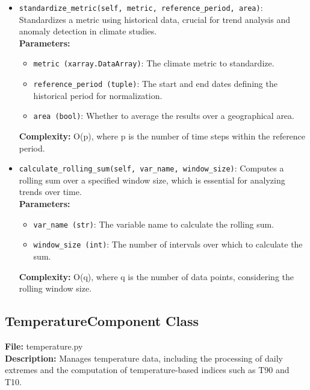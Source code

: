 \documentclass[a4paper,12pt]{article}
\begin{document}
\begin{itemize}
    \item \texttt{standardize\_metric(self, metric, reference\_period, area)}: Standardizes a metric using historical data, crucial for trend analysis and anomaly detection in climate studies. \\
    \textbf{Parameters:}
    \begin{itemize}
        \item \texttt{metric (xarray.DataArray)}: The climate metric to standardize.
        \item \texttt{reference\_period (tuple)}: The start and end dates defining the historical period for normalization.
        \item \texttt{area (bool)}: Whether to average the results over a geographical area.
    \end{itemize}
    \textbf{Complexity:} O(p), where p is the number of time steps within the reference period.
    
    \item \texttt{calculate\_rolling\_sum(self, var\_name, window\_size)}: Computes a rolling sum over a specified window size, which is essential for analyzing trends over time. \\
    \textbf{Parameters:}
    \begin{itemize}
        \item \texttt{var\_name (str)}: The variable name to calculate the rolling sum.
        \item \texttt{window\_size (int)}: The number of intervals over which to calculate the sum.
    \end{itemize}
    \textbf{Complexity:} O(q), where q is the number of data points, considering the rolling window size.
\end{itemize}

\subsection{TemperatureComponent Class}
\label{subsec:temperature-component-class}
\textbf{File:} temperature.py \\
\textbf{Description:} Manages temperature data, including the processing of daily extremes and the computation of temperature-based indices such as T90 and T10.
\end{document}
